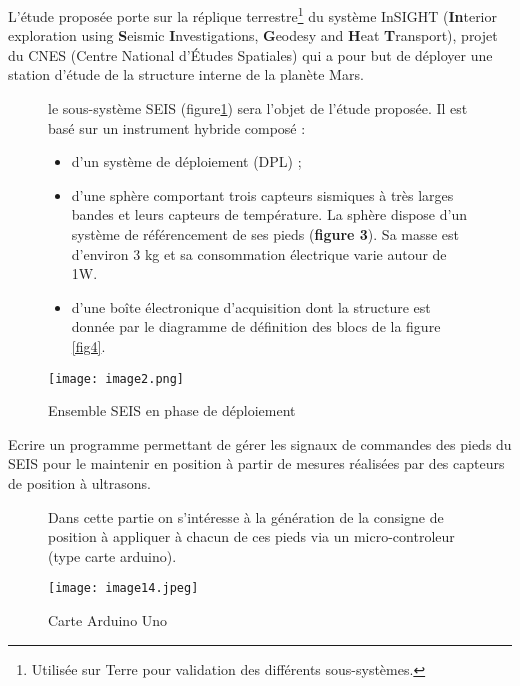 

L'étude proposée porte sur la réplique terrestre\footnote{Utilisée sur Terre pour validation des différents sous-systèmes.} du
système InSIGHT (\textbf{In}terior exploration using \textbf{S}eismic
\textbf{I}nvestigations, \textbf{G}eodesy and \textbf{H}eat
\textbf{T}ransport), projet du CNES (Centre National d'Études Spatiales)
qui a pour but de déployer une station d'étude de la structure interne
de la planète Mars.





\begin{figure}[!htb]
\begin{center}
\begin{minipage}{0.55\textwidth}
le sous-système SEIS (figure\ref{fig2}) sera l'objet de l'étude proposée. Il est
basé sur un instrument hybride composé :

\begin{itemize}
\item
  d'un système de déploiement (DPL) ;
\item
  d'une sphère comportant trois capteurs sismiques à très larges bandes
  et leurs capteurs de température. La sphère dispose d'un système de
  référencement de ses pieds (\textbf{figure 3}). Sa masse est d'environ
  3 kg et sa consommation électrique varie autour de 1W.
\item
  d'une boîte électronique d'acquisition dont la structure est donnée
  par le diagramme de définition des blocs de la figure \ref{fig4}.
\end{itemize}
\end{minipage}
\begin{minipage}{0.45\textwidth}
\texttt{[image: image2.png]}
\caption{Ensemble SEIS en phase de déploiement \label{fig2}}
\end{minipage}
\end{center}
\end{figure}

\begin{obj}
Ecrire un programme permettant de gérer les
signaux de commandes des pieds du SEIS pour le maintenir en position à
partir de mesures réalisées par des capteurs de position à ultrasons.
\end{obj}

\begin{figure}[!htb]
\begin{center}
\begin{minipage}{0.55\textwidth}
Dans cette partie on s'intéresse à la génération de la consigne de position à appliquer à chacun de ces pieds via un micro-controleur (type carte arduino).
\end{minipage}
\begin{minipage}{0.45\textwidth}
\texttt{[image: image14.jpeg]}
\caption{Carte Arduino Uno \label{fig3}}
\end{minipage}
\end{center}
\end{figure}


